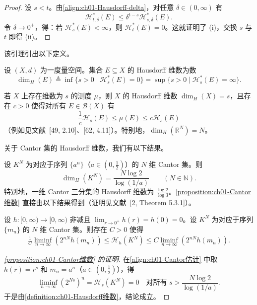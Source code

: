 \documentclass[../../main.tex]{subfiles}%
\begin{document}
\begin{proof}
设 $s<t$。由\eqref{align:ch01-Hausdorff-delta}，对任意 $\delta\in(0,\infty)$ 有
\[
\mathcal{H}_{t,\delta}^*(E)\leqslant\delta^{t-s}\mathcal{H}_{s,\delta}^*(E).
\]
令 $\delta\to0^+$，得：若 $\mathcal{H}_s^*(E)<\infty$，则 $\mathcal{H}_t^*(E)=0$。这就证明了 (i)，交换 $s$ 与 $t$ 即得 (ii)。
\end{proof}

该引理引出以下定义。

\begin{definition}\label{definition:ch01-Hausdorff维数}
设 $(X,d)$ 为一度量空间。集合 $E\subseteq X$ 的 Hausdorff 维数为数
\[
\dim_H(E)\triangleq \inf\{s>0\mid\mathcal{H}_s^*(E)=0\}=\sup\{s>0\mid\mathcal{H}_s^*(E)=\infty\}.
\]
\end{definition}

\begin{remark}\label{remark:ch01-Hausdorff维数与测度}
若 $X$ 上存在维数为 $s$ 的测度 $\mu$，则 $X$ 的 Hausdorff 维数 $\dim_H(X)=s$，且存在 $c>0$ 使得对所有 $E\in\mathcal{B}(X)$ 有
\[
\frac{1}{c}\mathcal{H}_s(E)\leqslant\mu(E)\leqslant c\mathcal{H}_s(E)
\]
（例如见文献~[49, 2.10]、[62, 4.11]）。特别地，$\dim_H(\mathbb{R}^N)=N$。
\end{remark}

关于 Cantor 集的 Hausdorff 维数，我们有以下结果。

\begin{proposition}\label{proposition:ch01-Cantor维数}
设 $K^N$ 为对应于序列 $\{a^n\}$（$a\in(0,\frac{1}{2})$）的 $N$ 维 Cantor 集。则
\[
\dim_H(K^N)=\frac{N\log 2}{\log(1/a)}\qquad(N\in\mathbb{N}).
\]
特别地，一维 Cantor 三分集的 Hausdorff 维数为 $\frac{\log 2}{\log 3}$。\cref{proposition:ch01-Cantor维数} 直接由以下结果得到（证明见文献~[2, Theorem 5.3.1]）。
\end{proposition}

\begin{theorem}\label{theorem:ch01-Cantor测度估计}
设 $h:[0,\infty)\to[0,\infty)$ 非减且 $\lim_{r\to0^+}h(r)=h(0)=0$。设 $K^N$ 为对应于序列 $\{m_n\}$ 的 $N$ 维 Cantor 集。则存在 $C>0$ 使得
\begin{align}
\frac{1}{C}\liminf_{n\to\infty}(2^{nN}h(m_n))\leqslant\mathcal{H}_h(K^N)\leqslant C\liminf_{n\to\infty}(2^{nN}h(m_n)). \label{align:ch01-Cantor估计}
\end{align}
\end{theorem}

\begin{proof}[\cref{proposition:ch01-Cantor维数} 的证明]
在\eqref{align:ch01-Cantor估计} 中取 $h(r)=r^s$ 和 $m_n=a^n$（$a\in(0,\frac{1}{2})$），得
\[
\liminf_{n\to\infty}(2^{Ns})^n=\mathcal{H}_s(K^N)=0
\quad\text{对所有 }s>\frac{N\log 2}{\log(1/a)}.
\]
于是由\cref{definition:ch01-Hausdorff维数}，结论成立。
\end{proof}
\end{document}
